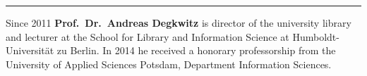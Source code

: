\begin{center}\rule{0.5\linewidth}{\linethickness}\end{center}

Since 2011 \textbf{Prof.~Dr.~Andreas Degkwitz} is director of the
university library and lecturer at the School for Library and
Information Science at Humboldt-Universität zu Berlin. In 2014 he
received a honorary professorship from the University of Applied
Sciences Potsdam, Department Information Sciences.
